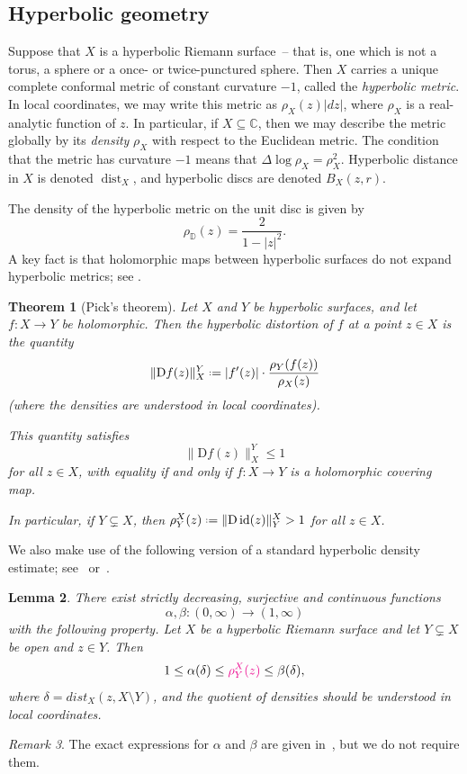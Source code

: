 \documentclass[12pt,a4paper,reqno]{amsart}
\theoremstyle{plain}
\newtheorem{thm}{Theorem}[section]
\newtheorem{lem}[thm]{Lemma}
\newcommand{\Deriv}{\mathrm D}
\renewcommand{\subset}{\subseteq}
\theoremstyle{definition}
\theoremstyle{remark}
\newtheorem{rmk}[thm]{Remark}
\newcommand{\DD}{\mathbb{D}}
\newcommand{\dist}{\operatorname{dist}}
\newcommand{\id}{\operatorname{id}}
\numberwithin{equation}{section}
\newcommand \C{\mathbb{C}}
\newcommand*{\defeq}{\mathrel{\vcenter{\baselineskip0.5ex \lineskiplimit0pt
                     \hbox{\scriptsize.}\hbox{\scriptsize.}}}%
                     =}
\newcommand{\lr}[1]{{\color{magenta} #1}}
\begin{document}
\subsection*{Hyperbolic geometry}
Suppose that $X$ is a hyperbolic Riemann surface~-- that is,
  one which is not
 a torus, a sphere or a once- or twice-punctured sphere.
 Then $X$ carries a unique complete conformal  metric 
 of constant curvature $-1$, called the 
 \emph{hyperbolic metric}. In local coordinates,
 we may write this metric as $\rho_X(z)\lvert dz\rvert$,
 where $\rho_X$ is a real-analytic function of $z$.
 In particular, if $X\subset\C$, then we may 
 describe the metric globally by its \emph{density} $\rho_X$
 with respect to the Euclidean metric. 
 The condition that the metric has curvature $-1$ means
 that $\Delta \log \rho_X = \rho_X^2$. 
 Hyperbolic distance in $X$ is denoted
 $\dist_X$, and hyperbolic discs are
 denoted $B_X(z,r)$.

 The density of the hyperbolic metric on the unit disc 
  is given by 
    \[ \rho_{\DD}(z) = \frac{2}{1-\lvert z\rvert^2}. \]
 A key fact is that holomorphic maps between
 hyperbolic surfaces do not 
  expand hyperbolic metrics; see \cite[Theorem 2.11]{milnor06}.

 \begin{thm}[Pick's theorem]
   Let $X$ and $Y$ be hyperbolic surfaces, and let
   $f\colon X\to Y$ be holomorphic. Then 
   the \emph{hyperbolic distortion} of $f$ at a point
   $z\in X$ is the quantity
   \[ \| \Deriv f(z)\|_X^Y \defeq \lvert f'(z)\rvert \cdot 
       \frac{\rho_Y(f(z))}{\rho_X(z)}\]
     (where the densities are understood in local 
     coordinates). 
     
     This quantity satisfies
      \[\| \Deriv f(z)\|_X^Y \leq 1\]
      for all $z\in X$, with equality if and only if
      $f\colon X\to Y$ is a holomorphic covering map. 

    \lr{In particular, if $Y\subsetneq X$, then
     $\rho^X_Y(z) \defeq \| \Deriv \id(z)\|_Y^X > 1$ for all $z\in X$.}
 \end{thm}

We also make use of the following version of a standard
hyperbolic density estimate; see~\cite[Proposition 3.4]{mihaljevicbrandt-rempegillen13} or~\cite[Theorem 1]{minda17}.
\begin{lem}\label{lem:hypercompare} There
exist strictly decreasing, surjective
and continuous functions
\[\alpha,\beta \colon (0,\infty)\to (1,\infty)\]
with the following property.
Let $X$ be a hyperbolic Riemann surface and let $Y\subsetneq X$ be open and $z\in Y$. Then
\[ 1\leq \alpha(\delta) \leq \lr{\rho_Y^X(z)}  
  \leq \beta(\delta),\]
 where $\delta = dist_X(z,X\setminus Y)$, and the
 quotient of densities should be understood in
 local coordinates. 
\end{lem}
\begin{rmk}
 The exact expressions 
 for $\alpha$ and $\beta$ are given in~\cite[Proposition 3.4]{mihaljevicbrandt-rempegillen13}, but we do not require
 them. 
\end{rmk}
\end{document}
